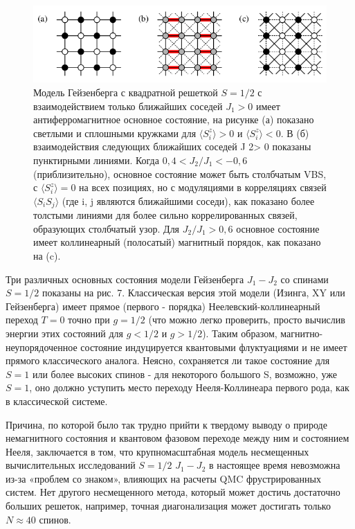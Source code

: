 \documentclass[11pt]{article}
\begin{document}
\begin{figure}[htp]
\centering
\includegraphics[scale=0.5]{fig7}
\caption{
Модель Гейзенберга с квадратной решеткой $S = 1/2$ с взаимодействием только ближайших соседей $J_1> 0$ имеет антиферромагнитное основное состояние, на рисунке (а) показано светлыми и сплошными кружками для $\langle S_i^z \rangle > 0$ и $\langle S_i^z \rangle <0$. В (б) взаимодействия следующих ближайших соседей J 2> 0 показаны пунктирными линиями. Когда $0,4 <J_2 / J_1 <−0,6$ (приблизительно), основное состояние может быть столбчатым VBS, с $\langle S_i^z \rangle =0$ на всех позициях, но с модуляциями в корреляциях связей $\langle S_i S_j \rangle$ (где i, j являются ближайшими соседи), как показано более толстыми линиями для более сильно коррелированных связей, образующих столбчатый узор. Для $J_2 / J_1> 0,6$ основное состояние имеет коллинеарный (полосатый) магнитный порядок, как показано на (c).}
\label{}
\end{figure}

Три различных основных состояния модели Гейзенберга $J_1-J_2$ со спинами $S = 1/2$ показаны на рис. 7. Классическая версия этой модели (Изинга, XY или Гейзенберга) имеет прямое (первого - порядка) Неелевский-коллинеарный переход $T = 0$ точно при $g = 1/2$ (что можно легко проверить, просто вычислив энергии этих состояний для $g <1/2$ и $g> 1/2$).
Таким образом, магнитно-неупорядоченное состояние индуцируется квантовыми флуктуациями и не имеет прямого классического аналога. Неясно, сохраняется ли такое состояние для $S = 1$ или более высоких спинов - для некоторого большого S, возможно, уже $S = 1$, оно должно уступить место переходу Нееля-Коллинеара первого рода, как в классической системе.

Причина, по которой было так трудно прийти к твердому выводу о природе немагнитного состояния и квантовом фазовом переходе между ним и состоянием Нееля, заключается в том, что крупномасштабная модель несмещенных вычислительных исследований $S = 1/2$ $J_1 -J_2$ в настоящее время невозможна из-за «проблем со знаком», влияющих на расчеты QMC фрустрированных систем.
Нет другого несмещенного метода, который может достичь достаточно больших решеток, например, точная диагонализация может достигать только $N ≈ 40$ спинов.
\end{document}
